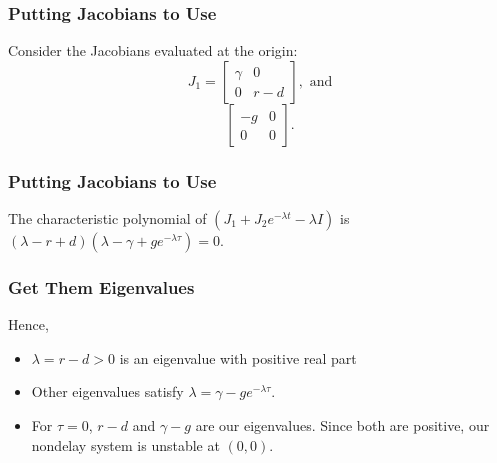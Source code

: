 \documentclass{beamer}
\begin{document}

\begin{frame}\frametitle{Putting Jacobians to Use}
Consider the Jacobians evaluated at the origin:$$J_1=\begin{bmatrix}
\gamma & 0\\
0 & r-d
\end{bmatrix}, \text{ and}$$ $$\begin{bmatrix}
-g & 0\\
0 & 0
\end{bmatrix}.$$ 
\end{frame}


\begin{frame}[c]\frametitle{Putting Jacobians to Use}
The characteristic polynomial of $(J_1+J_2e^{-\lambda t} -\lambda I)$ is $(\lambda - r + d)(\lambda -\gamma + ge^{-\lambda\tau})=0$. 
\end{frame}

\begin{frame}\frametitle{Get Them Eigenvalues}
Hence, \begin{itemize}{\itemsep .5in}\item $\lambda = r-d>0$ is an eigenvalue with positive real part\item Other eigenvalues satisfy $\lambda=\gamma-ge^{-\lambda\tau}$. \item For $\tau=0$, $r-d$ and $\gamma - g$ are our eigenvalues. Since both are positive, our nondelay system is unstable at $(0,0)$. \end{itemize}

\end{frame}
\end{document}
